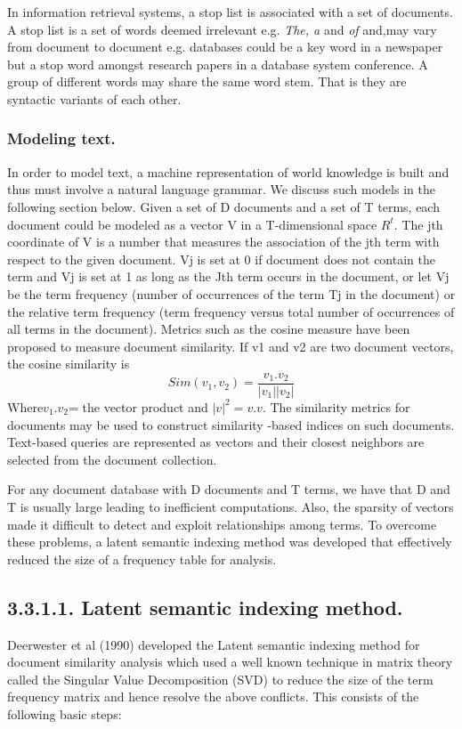 \documentclass{article}
\begin{document}
In information retrieval systems, a stop list is associated with a set of documents. A stop list is a set of words deemed irrelevant e.g. \textit{The, a} and\textit{ of} and,may vary from document to document e.g. {databases} could be a key word in a newspaper but a stop word amongst research papers in a database system conference. A group of different words may share the same word stem. That is they are syntactic variants of each other.



\subsubsection{ Modeling text.}
In order to model text, a machine representation of world knowledge is built and thus must involve a natural language grammar. We discuss such models in the following section below.
        Given a set of D documents and a set of T terms, each document could be modeled as a vector V in a T-dimensional space $R^{t}$. 
The jth coordinate of V is a number that measures the association of the jth term with respect to the given document. Vj is set at 0 if document does not contain the term and Vj is set at 1 as long as the Jth term occurs in the document, or let Vj be the term frequency (number of occurrences of the term Tj in the document) or the relative term frequency (term frequency versus total number of occurrences of all terms in the document).
Metrics such as the cosine measure have been proposed to measure document similarity. If v1 and v2 are two document vectors, the cosine similarity is    
 \begin{equation}Sim(v_{1},v_{2}) = \frac{v_{1}.v_{2}}{|v_{1}||v_{2}|} \end{equation}
Where$ v_{1}.v_{2}$= the vector product and $|v|^{2} = v.v.$
\newline The similarity metrics for documents may be used to construct similarity -based indices on such documents. Text-based queries are represented as vectors and their closest neighbors are selected from the document collection.

For any document database with D documents and T terms, we have that D and T is usually large leading to inefficient computations. Also, the sparsity of vectors made it difficult to detect and exploit relationships among terms. To overcome these problems, a latent semantic indexing method was developed that effectively reduced the size of a frequency table for analysis.
\subsection*{3.3.1.1. Latent semantic indexing method.}
Deerwester et al (1990) developed the Latent semantic indexing method for document similarity analysis which used a well known technique in matrix theory called the Singular Value Decomposition (SVD) to reduce the size of the term frequency matrix and hence resolve the above conflicts. 
This consists of the following basic steps: 
\end{document}
